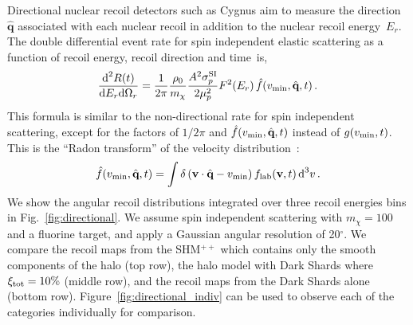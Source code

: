 \documentclass[prd,10pt,twocolumn,showpacs,nofootinbib,aps,superscriptaddress,preprintnumbers]{revtex4-1}
\newcommand{\eV}{\text{e\kern-0.15ex V}\xspace}
\newcommand{\GeV}{\text{G\eV}\xspace}
\newcommand{\vmin}{v_{\rm min}}
\begin{document}
  Directional nuclear recoil detectors such as {\sc Cygnus} aim to measure the
  direction~$\hat{\textbf{q}}$ associated with each nuclear recoil in
  addition to the nuclear recoil energy~$E_r$. The double differential
  event rate for spin independent elastic scattering as a function of recoil
  energy, recoil direction and time~is,
  \begin{equation}\label{eq:finaleventrate-directional}
   \frac{\textrm{d}^2R(t)}{\textrm{d}E_r\textrm{d}\Omega_r} =\frac{1}{2\pi}\frac{\rho_0}{m_\chi} \frac{A^2 \sigma^{\mathrm{SI}}_{p} }{2 \mu_{p}^2} F^2(E_r) \, \hat{f}(\vmin,\hat{\textbf{q}},t) \, .
  \end{equation}
  This formula is similar to the non-directional rate for
  spin independent scattering, except for the factors of $1/2\pi$ and
  $\hat{f}(\vmin,\hat{\textbf{q}},t)$ instead of $g(\vmin,t)$. This is
  the ``Radon transform'' of the velocity
  distribution~\cite{Gondolo:2002np,Radon}:
  \begin{equation}
   \hat{f}(\vmin,\hat{\textbf{q}},t) = \int \delta\left(\textbf{v} \cdot \hat{\textbf{q}} - \vmin\right) f_{\rm{lab}}(\textbf{v},t)\, \textrm{d}^3 v\, .
  \end{equation}
  We show the angular recoil distributions integrated over three recoil
  energies bins in Fig.~\ref{fig:directional}. We assume
  spin independent scattering with $m_{\chi}=100$~\GeV and a fluorine
  target, and apply a Gaussian angular resolution of 20$^\circ$.  We compare the
  recoil maps from the SHM$^{++}$ which contains only the smooth
  components of the halo (top row), the halo model with Dark Shards
  where $\xi_{\rm tot} = 10\%$ (middle row), and the recoil maps from
  the Dark Shards alone (bottom row).
  Figure~\ref{fig:directional_indiv} can be used to observe each of the categories
  individually for comparison.
\end{document}
